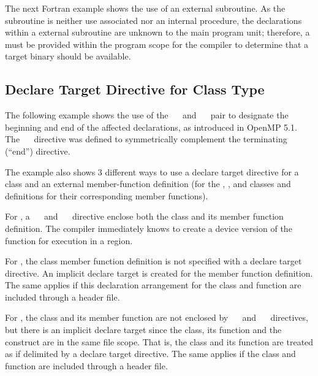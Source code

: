 
The next Fortran example shows the use of an external subroutine. As the subroutine
is neither use associated nor an internal procedure, the  
declarations within a external subroutine are unknown to the main program unit; 
therefore, a   must be provided within the program
scope for the compiler to determine that a target binary should be available.


\subsection{Declare Target Directive for Class Type}
\label{subsec:declare_target_class}


The following example shows the use of the ~~
and ~~ pair to designate the beginning and
end of the affected declarations, as introduced in OpenMP 5.1.
The ~~ directive was defined
to symmetrically complement the terminating (``end'') directive.

\cppspecificstart

The example also shows 3 different ways to use a declare target directive for a 
class and an external member-function definition (for the , , 
and  classes and definitions for their corresponding  member functions).

For , a ~~ and 
~~ directive
enclose both the class and its member function definition. The compiler immediately
knows to create a device version of the function for execution in a  region.

For , the class member function definition is not specified with a
declare target directive.
An implicit declare target is created for the member function definition.
The same applies if this declaration arrangement for the class and function 
are included through a header file.

For , the class and its member function are not enclosed by ~~
and ~~ directives,
but there is an implicit declare target since the class, its function
and the  construct are in the same file scope. That is, the class
and its function are treated as if delimited by a declare target directive.
The same applies if the class and function are included through a header file.

